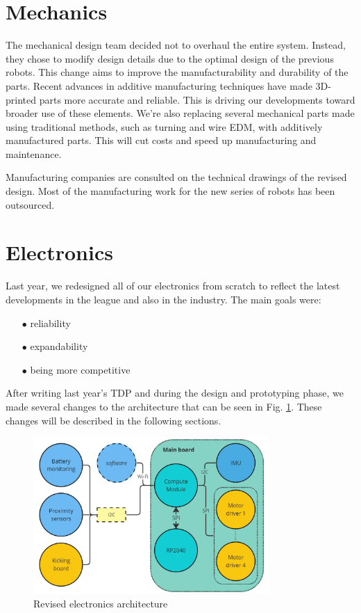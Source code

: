 \documentclass[runningheads]{llncs}
\begin{document}
\section {Mechanics}
The mechanical design team decided not to overhaul the entire system. Instead, they chose to modify design details due to the optimal design of the previous robots. This change aims to improve the manufacturability and durability of the parts. Recent advances in additive manufacturing techniques have made 3D-printed parts more accurate and reliable. This is driving our developments toward broader use of these elements. We're also replacing several mechanical parts made using traditional methods, such as turning and wire EDM, with additively manufactured parts. This will cut costs and speed up manufacturing and maintenance.

Manufacturing companies are consulted on the technical drawings of the revised design. Most of the manufacturing work for the new series of robots has been outsourced.

\section{Electronics}

\indent Last year, we redesigned all of our electronics from scratch to reflect the latest developments in the league and also in the industry. The main goals were:

\begin{enumerate}
    \item[$\bullet$] reliability
    \item[$\bullet$] expandability
    \item[$\bullet$] being more competitive
\end{enumerate}

After writing last year's TDP and during the design and prototyping phase, we made several changes to the architecture that can be seen in Fig. \ref{fig:electronics-architecture}. These changes will be described in the following sections.

\begin{figure}
	\centering
	\includegraphics[width=0.8\textwidth]{images/electronics-architecture.jpg}
	\caption{Revised electronics architecture}
	\label{fig:electronics-architecture}
\end{figure}
\end{document}
